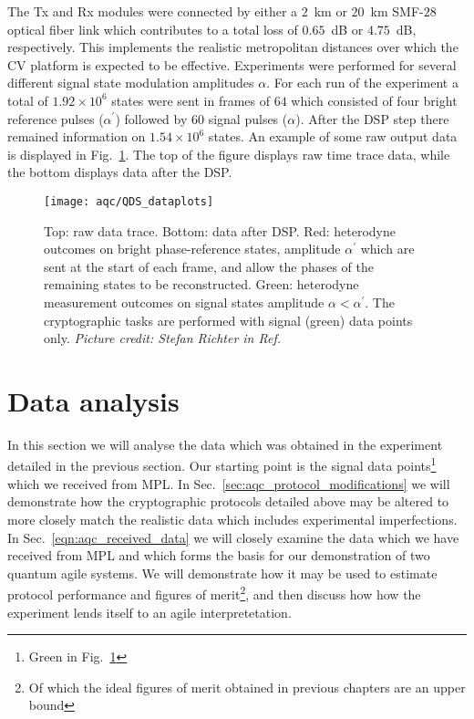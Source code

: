 The Tx and Rx modules were connected by either a $2$~km or $20$~km SMF-$28$ optical fiber link which contributes to a total loss of $0.65$~dB or $4.75$~dB, respectively. This implements the realistic metropolitan distances over which the CV platform is expected to be effective. Experiments were performed for several different signal state modulation amplitudes $\alpha$. For each run of the experiment a total of $1.92\times 10^6$ states were sent in frames of $64$ which consisted of four bright reference pulses ($\alpha^\prime$) followed by $60$ signal pulses ($\alpha$). After the DSP step there remained information on $1.54 \times 10^6$ states. An example of some raw output data is displayed in Fig.~\ref{fig:aqc_experimental_trace}. The top of the figure displays raw time trace data, while the bottom displays data after the DSP.


\begin{figure}[htp]
\captionsetup{width=0.8\linewidth}
\centering
\texttt{[image: aqc/QDS\_dataplots]}
\caption{\label{fig:aqc_experimental_trace} Top: raw data trace. Bottom: data after DSP. Red: heterodyne outcomes on bright phase-reference states, amplitude $\alpha^\prime$ which are sent at the start of each frame, and allow the phases of the remaining states to be reconstructed. Green: heterodyne measurement outcomes on signal states amplitude $\alpha < \alpha^\prime$. The cryptographic tasks are performed with signal (green) data points only. \emph{Picture credit: Stefan Richter in Ref.~\cite{Richter2020}}
}
\end{figure}

\clearpage
\section{Data analysis}
In this section we will analyse the data which was obtained in the experiment detailed in the previous section. Our starting point is the signal data points\footnote{Green in Fig.~\ref{fig:aqc_experimental_trace}} which we received from MPL. In Sec.~\ref{sec:aqc_protocol_modifications} we will demonstrate how the cryptographic protocols detailed above may be altered to more closely match the realistic data which includes experimental imperfections. %
In Sec.~\ref{eqn:aqc_received_data} we will closely examine the data which we have received from MPL and which forms the basis for our demonstration of two quantum agile systems. We will demonstrate how it may be used to estimate protocol performance and figures of merit\footnote{Of which the ideal figures of merit obtained in previous chapters are an upper bound}, and then discuss how how the experiment lends itself to an agile interpretetation.

